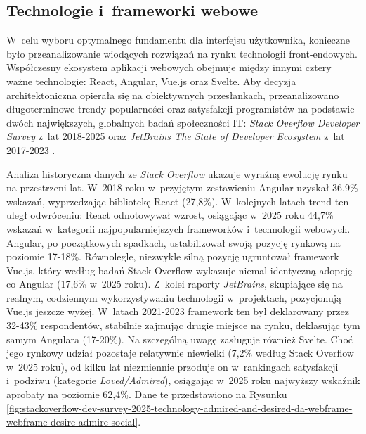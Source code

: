 \subsection{Technologie i~frameworki webowe}
\label{subsec:technologie-i-frameworki-webowe}

W~celu wyboru optymalnego fundamentu dla interfejsu użytkownika, konieczne było przeanalizowanie wiodących rozwiązań na rynku technologii front-endowych.
Współczesny ekosystem aplikacji webowych obejmuje między innymi cztery ważne technologie: React, Angular, Vue.js oraz Svelte.
Aby decyzja architektoniczna opierała się na obiektywnych przesłankach, przeanalizowano długoterminowe trendy popularności oraz satysfakcji programistów na podstawie dwóch największych, globalnych badań społeczności IT: \textit{Stack Overflow Developer Survey} z~lat 2018-2025 \cite{so_survey_2018, so_survey_2019, so_survey_2020, so_survey_2021, so_survey_2022, so_survey_2023, so_survey_2024, so_survey_2025} oraz \textit{JetBrains The State of Developer Ecosystem} z~lat 2017-2023 \cite{jb_survey_2017, jb_survey_2018, jb_survey_2019, jb_survey_2020, jb_survey_2021, jb_survey_2022, jb_survey_2023}.

Analiza historyczna danych ze \textit{Stack Overflow} ukazuje wyraźną ewolucję rynku na przestrzeni lat.
W~2018 roku w~przyjętym zestawieniu Angular uzyskał 36,9\% wskazań, wyprzedzając bibliotekę React (27,8\%).
W~kolejnych latach trend ten uległ odwróceniu: React odnotowywał wzrost, osiągając w~2025 roku 44,7\% wskazań w~kategorii najpopularniejszych frameworków i~technologii webowych.
Angular, po początkowych spadkach, ustabilizował swoją pozycję rynkową na poziomie 17-18\%.
Równolegle, niezwykle silną pozycję ugruntował framework Vue.js, który według badań Stack Overflow wykazuje niemal identyczną adopcję co Angular (17,6\% w~2025 roku).
Z~kolei raporty \textit{JetBrains}, skupiające się na realnym, codziennym wykorzystywaniu technologii w~projektach, pozycjonują Vue.js jeszcze wyżej.
W~latach 2021-2023 framework ten był deklarowany przez 32-43\% respondentów, stabilnie zajmując drugie miejsce na rynku, deklasując tym samym Angulara (17-20\%).
Na szczególną uwagę zasługuje również Svelte.
Choć jego rynkowy udział pozostaje relatywnie niewielki (7,2\% według Stack Overflow w~2025 roku), od kilku lat niezmiennie przoduje on w~rankingach satysfakcji i~podziwu (kategorie \textit{Loved/Admired}), osiągając w~2025 roku najwyższy wskaźnik aprobaty na poziomie 62,4\%.
Dane te przedstawiono na Rysunku \ref{fig:stackoverflow-dev-survey-2025-technology-admired-and-desired-da-webframe-webframe-desire-admire-social}.

